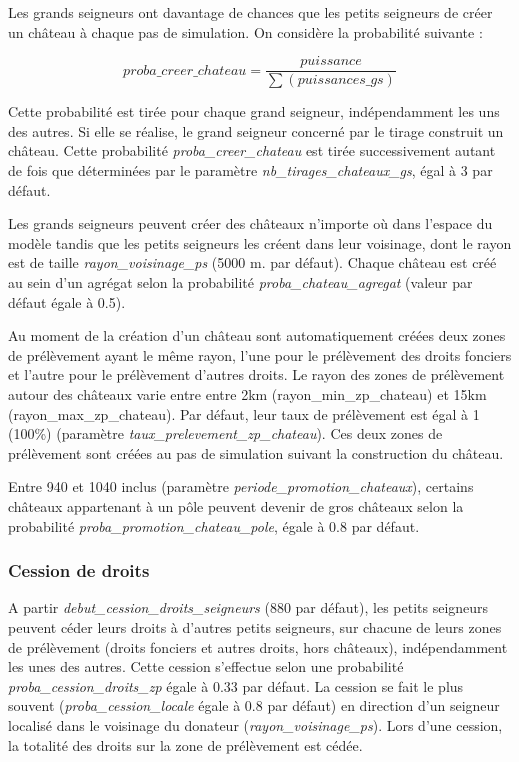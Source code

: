 \documentclass[a4paper,11pt]{article}
\begin{document}
{\bigskip
Les grands seigneurs ont davantage de chances que les petits seigneurs de créer un château à chaque pas de simulation. On considère la probabilité suivante :
\begin{small}
\begin{equation}
proba\_creer\_chateau = \frac{puissance}{\sum(puissances\_gs)}
\end{equation}
\end{small}

Cette probabilité est tirée pour chaque grand seigneur, indépendamment les uns des autres. Si elle se réalise, le grand seigneur concerné par le tirage construit un château. Cette probabilité \textit{proba\_creer\_chateau} est tirée successivement autant de fois que déterminées par le paramètre \textit{nb\_tirages\_chateaux\_gs}, égal à 3 par défaut.

\bigskip
Les grands seigneurs peuvent créer des châteaux n'importe où dans l'espace du modèle tandis que les petits seigneurs les créent dans leur voisinage, dont le rayon est de taille \textit{rayon\_voisinage\_ps} (5000 m. par défaut). Chaque château est créé au sein d'un agrégat selon la probabilité \textit{proba\_chateau\_agregat} (valeur par défaut égale à 0.5).

\bigskip
\begin{sloppypar}
Au moment de la création d'un château sont automatiquement créées deux zones de prélèvement ayant le même rayon, l'une pour le prélèvement des droits fonciers et l'autre pour le prélèvement d'autres droits. Le rayon des zones de prélèvement autour des châteaux varie entre entre 2km (rayon\_min\_zp\_chateau) et 15km (rayon\_max\_zp\_chateau). Par défaut, leur taux de prélèvement est égal à 1 (100\%) (paramètre \textit{taux\_prelevement\_zp\_chateau}).
Ces deux zones de prélèvement sont créées au pas de simulation suivant la construction du château.
\end{sloppypar}

\bigskip
Entre 940 et 1040 inclus (paramètre \textit{periode\_promotion\_chateaux}), certains châteaux appartenant à un pôle peuvent devenir de gros châteaux selon la probabilité \textit{proba\_promotion\_chateau\_pole}, égale à 0.8 par défaut.


\subsubsection{Cession de droits}
\begin{sloppypar}
A partir \textit{debut\_cession\_droits\_seigneurs} (880 par défaut), les petits seigneurs peuvent céder leurs droits à d'autres petits seigneurs, sur chacune de leurs zones de prélèvement (droits fonciers et autres droits, hors châteaux), indépendamment les unes des autres. Cette cession s'effectue selon une probabilité \textit{proba\_cession\_droits\_zp} égale à 0.33 par défaut. La cession se fait le plus souvent (\textit{proba\_cession\_locale} égale à 0.8 par défaut) en direction d'un seigneur localisé dans le voisinage du donateur (\textit{rayon\_voisinage\_ps}). Lors d'une cession, la totalité des droits sur la zone de prélèvement est cédée.


\end{sloppypar}}
\end{document}
